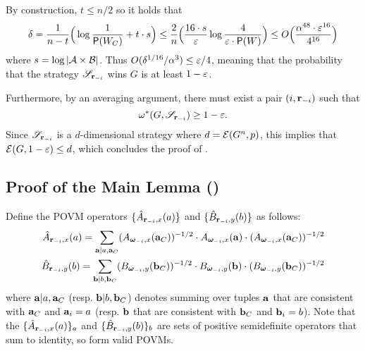 By construction, $t \leq n/2$ so it holds that
\[
\delta = \frac{1}{n-t} \Big( \log \frac{1}{\mathsf{P}(W_C)} + t \cdot s \Big) \leq \frac{2}{n} \Big ( \frac{16 \cdot s}{\varepsilon} \log \frac{4}{\varepsilon \cdot \mathsf{P}(W)} \Big) \leq O \Big( \frac{\alpha^{48} \cdot \varepsilon^{16}}{4^{16}} \Big)
\]
where $s = \log |\mathcal{A} \times \mathcal{B}|$. Thus $O(\delta^{1/16}/\alpha^3) \leq \varepsilon/4$, meaning that the probability that the strategy $\mathscr{S}_{\mathbf{r}_{-i}}$ wins $G$ is at least $1 - \varepsilon$.

Furthermore, by an averaging argument, there must exist a pair $(i,\mathbf{r}_{-i})$ such that
\[
	\omega^*(G,\mathscr{S}_{\mathbf{r}_{-i}}) \geq 1 - \varepsilon.
\]
Since $\mathscr{S}_{\mathbf{r}_{-i}}$ is a $d$-dimensional strategy where $d = \mathcal{E}(G^n,p)$, this implies that $\mathcal{E}(G,1 - \varepsilon) \leq d$, which concludes the proof of .

\subsection{Proof of the Main Lemma ()}
\label{sec:main-lemma-proof}


Define the POVM operators $\{\hat{A}_{\mathbf{r}_{-i},x}(a) \}$ and $\{\hat{B}_{\mathbf{r}_{-i}, y}(b)\}$ as follows:
\begin{align*}
	\hat{A}_{\mathbf{r}_{-i},x}(a) = \sum_{\mathbf{a} | a, \mathbf{a}_C} (A_{{\boldsymbol{\omega}}_{-i},x}(\mathbf{a}_C) )^{-1/2} \cdot A_{{\boldsymbol{\omega}}_{-i},x}(\mathbf{a}) \cdot (A_{{\boldsymbol{\omega}}_{-i},x}(\mathbf{a}_C) )^{-1/2} \\
	\hat{B}_{\mathbf{r}_{-i}, y}(b) = \sum_{\mathbf{b} | b, \mathbf{b}_C}  (B_{{\boldsymbol{\omega}}_{-i},y}(\mathbf{b}_C) )^{-1/2} \cdot B_{{\boldsymbol{\omega}}_{-i},y}(\mathbf{b}) \cdot (B_{{\boldsymbol{\omega}}_{-i},y}(\mathbf{b}_C) )^{-1/2}
\end{align*}
where $\mathbf{a} | a, \mathbf{a}_C$ (resp. $\mathbf{b} | b, \mathbf{b}_C$) denotes summing over tuples $\mathbf{a}$ that are consistent with $\mathbf{a}_C$ and $\mathbf{a}_i = a$ (resp. $\mathbf{b}$ that are consistent with $\mathbf{b}_C$ and $\mathbf{b}_i = b$). Note that the $\{\hat{A}_{\mathbf{r}_{-i}, x}(a) \}_{a}$ and $\{\hat{B}_{\mathbf{r}_{-i},y}(b)\}_{b}$ are sets of positive semidefinite operators that sum to identity, so form valid POVMs. 

